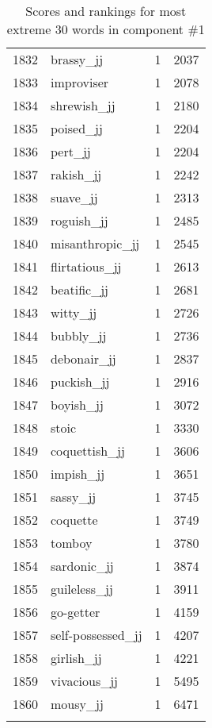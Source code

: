 \begin{longtable}[!htbp]{| rlr@{.}l |}
    1832 & brassy\_jj & 1 & 2037 \\
    1833 & improviser & 1 & 2078 \\
    1834 & shrewish\_jj & 1 & 2180 \\
    1835 & poised\_jj & 1 & 2204 \\
    1836 & pert\_jj & 1 & 2204 \\
    1837 & rakish\_jj & 1 & 2242 \\
    1838 & suave\_jj & 1 & 2313 \\
    1839 & roguish\_jj & 1 & 2485 \\
    1840 & misanthropic\_jj & 1 & 2545 \\
    1841 & flirtatious\_jj & 1 & 2613 \\
    1842 & beatific\_jj & 1 & 2681 \\
    1843 & witty\_jj & 1 & 2726 \\
    1844 & bubbly\_jj & 1 & 2736 \\
    1845 & debonair\_jj & 1 & 2837 \\
    1846 & puckish\_jj & 1 & 2916 \\
    1847 & boyish\_jj & 1 & 3072 \\
    1848 & stoic & 1 & 3330 \\
    1849 & coquettish\_jj & 1 & 3606 \\
    1850 & impish\_jj & 1 & 3651 \\
    1851 & sassy\_jj & 1 & 3745 \\
    1852 & coquette & 1 & 3749 \\
    1853 & tomboy & 1 & 3780 \\
    1854 & sardonic\_jj & 1 & 3874 \\
    1855 & guileless\_jj & 1 & 3911 \\
    1856 & go-getter & 1 & 4159 \\
    1857 & self-possessed\_jj & 1 & 4207 \\
    1858 & girlish\_jj & 1 & 4221 \\
    1859 & vivacious\_jj & 1 & 5495 \\
    1860 & mousy\_jj & 1 & 6471 \\
    \hline
    \caption{Scores and rankings for most extreme 30 words in component \#1} \\
\end{longtable}

